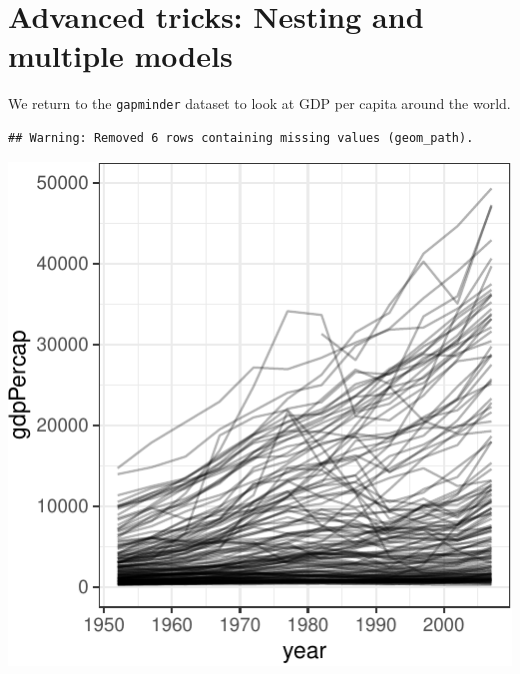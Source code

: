 \documentclass[12pt,]{article}
\newenvironment{Shaded}{\begin{snugshade}}{\end{snugshade}}
\newcommand{\KeywordTok}[1]{\textcolor[rgb]{0.13,0.29,0.53}{\textbf{#1}}}
\newcommand{\DataTypeTok}[1]{\textcolor[rgb]{0.13,0.29,0.53}{#1}}
\newcommand{\DecValTok}[1]{\textcolor[rgb]{0.00,0.00,0.81}{#1}}
\newcommand{\FloatTok}[1]{\textcolor[rgb]{0.00,0.00,0.81}{#1}}
\newcommand{\StringTok}[1]{\textcolor[rgb]{0.31,0.60,0.02}{#1}}
\newcommand{\OperatorTok}[1]{\textcolor[rgb]{0.81,0.36,0.00}{\textbf{#1}}}
\newcommand{\NormalTok}[1]{#1}
\begin{document}
\section{Advanced tricks: Nesting and multiple
models}\label{advanced-tricks-nesting-and-multiple-models}

We return to the \texttt{gapminder} dataset to look at GDP per capita
around the world.

\begin{Shaded}
\end{Shaded}

\begin{verbatim}
## Warning: Removed 6 rows containing missing values (geom_path).
\end{verbatim}

\begin{center}\includegraphics{Intro_tips_tricks_files/figure-latex/nest_mult_mod-1} \end{center}
\end{document}
